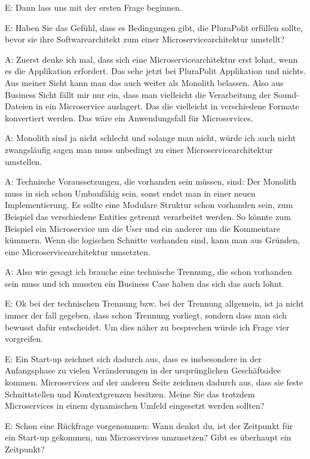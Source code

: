 E: Dann lass uns mit der ersten Frage beginnen.

E: Haben Sie das Gefühl, dass es Bedingungen gibt, die PluraPolit erfüllen sollte, bevor sie ihre Softwarearchitekt zum einer Microservicearchitektur umstellt? 

A: Zuerst denke ich mal, dass sich eine Microservicearchitektur erst lohnt, wenn es die Applikation erfordert. Das sehe jetzt bei PluraPolit Applikation und nichts. Aus meiner Sicht kann man das auch weiter als Monolith belassen.  Also aus Business Sicht fällt mir nur ein,  dass man vielleicht die Verarbeitung der Sound-Dateien in ein Microservice auslagert. Das die vielleicht in verschiedene Formate konvertiert werden. Das wäre ein Anwendungsfall für Microservices. 

A: Monolith sind ja nicht schlecht und solange man nicht, würde ich auch nicht zwangsläufig sagen man muss unbedingt zu einer Microservicearchitektur umstellen.

A: Technische Voraussetzungen, die vorhanden sein müssen, sind: Der Monolith muss in sich schon Umbaufähig sein, sonst endet man in einer neuen Implementierung. Es sollte eine Modulare Struktur schon vorhanden sein, zum Beispiel das verschiedene Entities getrennt verarbeitet werden. So könnte zum Beispiel ein Microservice um die User und ein anderer um  die Kommentare kümmern. Wenn die logischen Schnitte vorhanden sind, kann man aus Gründen, eine Microservicearchitektur umsetzten. 

A: Also wie gesagt ich brauche eine technische Trennung, die schon vorhanden sein muss und ich mussten ein Business Case haben das sich das auch lohnt.

E: Ok bei der technischen Trennung bzw. bei der Trennung allgemein, ist ja nicht immer der fall gegeben, dass schon Trennung vorliegt, sondern dass man sich bewusst dafür entscheidet. Um dies näher zu besprechen würde ich Frage vier vorgreifen.

E: Ein Start-up zeichnet sich dadurch aus, dass es insbesondere in der Anfangsphase zu vielen Veränderungen in der ursprünglichen Geschäftsidee kommen. Microservices auf der anderen Seite zeichnen dadurch aus, dass sie feste Schnittstellen und Kontextgrenzen besitzen. Meine Sie das trotzdem Microservices in einem dynamischen Umfeld eingesetzt werden sollten?

E: Schon eine Rückfrage vorgenommen: Wann denkst du, ist der Zeitpunkt für ein Start-up gekommen, um Microservices umzusetzen? Gibt es überhaupt ein Zeitpunkt? 

